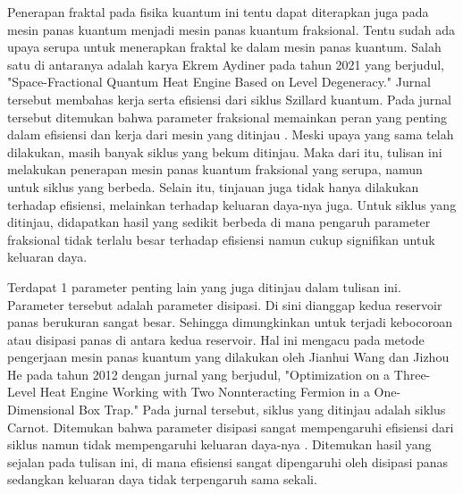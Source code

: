 \par Penerapan fraktal pada fisika kuantum ini tentu dapat diterapkan juga pada mesin panas kuantum menjadi mesin panas kuantum fraksional. Tentu sudah ada upaya serupa untuk menerapkan fraktal ke dalam mesin panas kuantum. Salah satu di antaranya adalah karya Ekrem Aydiner pada tahun 2021 yang berjudul, "Space-Fractional Quantum Heat Engine Based on Level Degeneracy." Jurnal tersebut membahas kerja serta efisiensi dari siklus Szillard kuantum. Pada jurnal tersebut ditemukan bahwa parameter fraksional memainkan peran yang penting dalam efisiensi dan kerja dari mesin yang ditinjau \cite{Aydiner2021Space}. Meski upaya yang sama telah dilakukan, masih banyak siklus yang bekum ditinjau. Maka dari itu, tulisan ini melakukan penerapan mesin panas kuantum fraksional yang serupa, namun untuk siklus yang berbeda. Selain itu, tinjauan juga tidak hanya dilakukan terhadap efisiensi, melainkan terhadap keluaran daya-nya juga. Untuk siklus yang ditinjau, didapatkan hasil yang sedikit berbeda di mana pengaruh parameter fraksional tidak terlalu besar terhadap efisiensi namun cukup signifikan untuk keluaran daya.
\par Terdapat 1 parameter penting lain yang juga ditinjau dalam tulisan ini. Parameter tersebut adalah parameter disipasi. Di sini dianggap kedua reservoir panas berukuran sangat besar. Sehingga dimungkinkan untuk terjadi kebocoroan atau disipasi panas di antara kedua reservoir. Hal ini mengacu pada metode pengerjaan mesin panas kuantum yang dilakukan oleh Jianhui Wang dan Jizhou He pada tahun 2012 dengan jurnal yang berjudul, "Optimization on a Three-Level Heat Engine Working with Two Nonnteracting Fermion in a One-Dimensional Box Trap." Pada jurnal tersebut, siklus yang ditinjau adalah siklus Carnot. Ditemukan bahwa parameter disipasi sangat mempengaruhi efisiensi dari siklus namun tidak mempengaruhi keluaran daya-nya \cite{Wang2012Optimization}. Ditemukan hasil yang sejalan pada tulisan ini, di mana efisiensi sangat dipengaruhi oleh disipasi panas sedangkan keluaran daya tidak terpengaruh sama sekali. 



